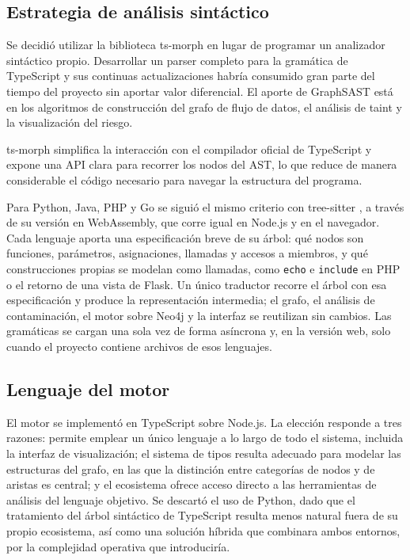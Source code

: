 \subsection{Estrategia de análisis sintáctico}\label{sec:n4.3.1}

Se decidió utilizar la biblioteca ts-morph en lugar de programar un analizador sintáctico propio. Desarrollar un parser completo para la gramática de TypeScript y sus continuas actualizaciones habría consumido gran parte del tiempo del proyecto sin aportar valor diferencial. El aporte de GraphSAST está en los algoritmos de construcción del grafo de flujo de datos, el análisis de taint y la visualización del riesgo.

ts-morph simplifica la interacción con el compilador oficial de TypeScript y expone una API clara para recorrer los nodos del AST, lo que reduce de manera considerable el código necesario para navegar la estructura del programa.

Para Python, Java, PHP y Go se siguió el mismo criterio con tree-sitter \citep{treesitter}, a través de su versión en WebAssembly, que corre igual en Node.js y en el navegador. Cada lenguaje aporta una especificación breve de su árbol: qué nodos son funciones, parámetros, asignaciones, llamadas y accesos a miembros, y qué construcciones propias se modelan como llamadas, como \texttt{echo} e \texttt{include} en PHP o el retorno de una vista de Flask. Un único traductor recorre el árbol con esa especificación y produce la representación intermedia; el grafo, el análisis de contaminación, el motor sobre Neo4j y la interfaz se reutilizan sin cambios. Las gramáticas se cargan una sola vez de forma asíncrona y, en la versión web, solo cuando el proyecto contiene archivos de esos lenguajes.

\subsection{Lenguaje del motor}\label{sec:n4.3.2}

El motor se implementó en TypeScript sobre Node.js. La elección responde a tres razones: permite emplear un único lenguaje a lo largo de todo el sistema, incluida la interfaz de visualización; el sistema de tipos resulta adecuado para modelar las estructuras del grafo, en las que la distinción entre categorías de nodos y de aristas es central; y el ecosistema ofrece acceso directo a las herramientas de análisis del lenguaje objetivo. Se descartó el uso de Python, dado que el tratamiento del árbol sintáctico de TypeScript resulta menos natural fuera de su propio ecosistema, así como una solución híbrida que combinara ambos entornos, por la complejidad operativa que introduciría.

